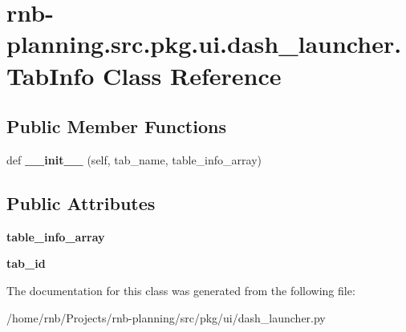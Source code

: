 \hypertarget{classrnb-planning_1_1src_1_1pkg_1_1ui_1_1dash__launcher_1_1_tab_info}{}\section{rnb-\/planning.src.\+pkg.\+ui.\+dash\+\_\+launcher.\+Tab\+Info Class Reference}
\label{classrnb-planning_1_1src_1_1pkg_1_1ui_1_1dash__launcher_1_1_tab_info}
\subsection*{Public Member Functions}
\begin{DoxyCompactItemize}
\item 
\mbox{\label{classrnb-planning_1_1src_1_1pkg_1_1ui_1_1dash__launcher_1_1_tab_info_ae4e58724060b4988f0674f80974f7bfd}} 
def {\bfseries \+\_\+\+\_\+init\+\_\+\+\_\+} (self, tab\+\_\+name, table\+\_\+info\+\_\+array)
\end{DoxyCompactItemize}
\subsection*{Public Attributes}
\begin{DoxyCompactItemize}
\item 
\mbox{\label{classrnb-planning_1_1src_1_1pkg_1_1ui_1_1dash__launcher_1_1_tab_info_a887aa042420d70c09914df42833bdf2c}} 
{\bfseries table\+\_\+info\+\_\+array}
\item 
\mbox{\label{classrnb-planning_1_1src_1_1pkg_1_1ui_1_1dash__launcher_1_1_tab_info_a9a54ca7e0ddf7ce08ebef28a8fdaba8b}} 
{\bfseries tab\+\_\+id}
\end{DoxyCompactItemize}


The documentation for this class was generated from the following file\+:\begin{DoxyCompactItemize}
\item 
/home/rnb/\+Projects/rnb-\/planning/src/pkg/ui/dash\+\_\+launcher.\+py\end{DoxyCompactItemize}
